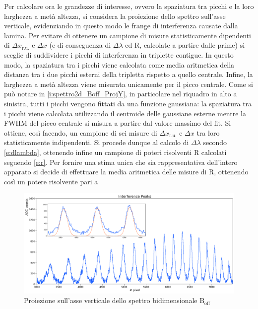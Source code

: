 \documentclass[twocolumn,10pt]{asme2ej}
\begin{document}
Per calcolare ora le grandezze di interesse, ovvero la spaziatura tra picchi e la loro larghezza a metà altezza, si
considera la proiezione dello spettro sull'asse verticale, evidenziando in questo modo le frange di interferenza causate
dalla lamina. Per evitare di ottenere un campione di misure statisticamente dipendenti di $\Delta x_{\text{r.u.}}$ e
$\Delta x$ (e di conseguenza di $\Delta\lambda$ ed R, calcolate a partire dalle prime) si sceglie di suddividere i
picchi di interferenza in triplette contigue. In questo modo, la spaziatura tra i picchi viene calcolata come media
aritmetica della distanza tra i due picchi esterni della tripletta rispetto a quello centrale. Infine, la larghezza a
metà altezza viene misurata unicamente per il picco centrale. Come si può notare in \autoref{i:spettro2d_Boff_ProjY}, in
particolare nel riquadro in alto a sinistra, tutti i picchi vengono fittati da una funzione gaussiana: la spaziatura tra
i picchi viene calcolata utilizzando il centroide delle gaussiane esterne mentre la FWHM del picco centrale si misura a
partire dal valore massimo del fit. Si ottiene, così facendo, un campione di sei misure di $\Delta x_{\text{r.u.}}$ e
$\Delta x$ tra loro statisticamente indipendenti. Si procede dunque al calcolo di $\Delta\lambda$ secondo
\autoref{e:dlambda}, ottenendo infine un campione di poteri risolventi R calcolati seguendo \autoref{e:r}. Per fornire
una stima unica che sia rappresentativa dell'intero apparato si decide di effettuare la media aritmetica delle misure di
R, ottenendo così un potere risolvente pari a 

\begin{figure}
    \centering
    \includegraphics[width=\textwidth]{../Plots/Boff_Y_proj.png}
   \caption{Proiezione sull'asse verticale dello spettro bidimensionale $\text{B}_{\text{off}}$}
    \label{i:spettro2d_Boff_ProjY}
\end{figure}
\end{document}
